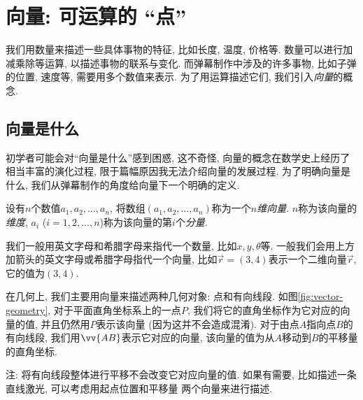 \section{向量: 可运算的 ``点''} \label{sec:vector}

我们用数量来描述一些具体事物的特征, 比如长度, 温度, 价格等.
数量可以进行加减乘除等运算, 以描述事物的联系与变化.
而弹幕制作中涉及的许多事物, 比如子弹的位置, 速度等,
需要用多个数值来表示.
为了用运算描述它们, 我们引入\emph{向量}的概念.

\subsection{向量是什么}

初学者可能会对``向量是什么''感到困惑,
这不奇怪, 向量的概念在数学史上经历了相当丰富的演化过程,
限于篇幅原因我无法介绍向量的发展过程.
为了明确向量是什么, 我们从弹幕制作的角度给向量下一个明确的定义.




\begin{definition}[向量]
  设有$n$个数值$a_1,a_2,\dots,a_n$,
  将数组$(a_1,a_2,\dots,a_n)$称为一个\emph{$n$维向量}.
  $n$称为该向量的\emph{维度},
  $a_i$ ($i=1,2,\dots,n$)称为该向量的第$i$个\emph{分量}.
\end{definition}

我们一般用英文字母和希腊字母来指代一个数量, 比如$x,y,\theta$等.
一般我们会用上方加箭头的英文字母或希腊字母指代一个向量,
比如$\vec r=(3,4)$表示一个二维向量$\vec r$, 它的值为$(3,4)$.

在几何上, 我们主要用向量来描述两种几何对象: 点和有向线段.
如图\ref{fig:vector-geometry},
对于平面直角坐标系上的一点$P$,
我们将它的直角坐标作为它对应的向量的值,
并且仍然用$P$表示该向量 (因为这并不会造成混淆).
对于由点$A$指向点$B$的有向线段,
我们用$\vv{AB}$表示它对应的向量,
该向量的值为从$A$移动到$B$的平移量的直角坐标.

注: 将有向线段整体进行平移不会改变它对应向量的值.
如果有需要, 比如描述一条直线激光, 可以考虑用起点位置和平移量
两个向量来进行描述.


